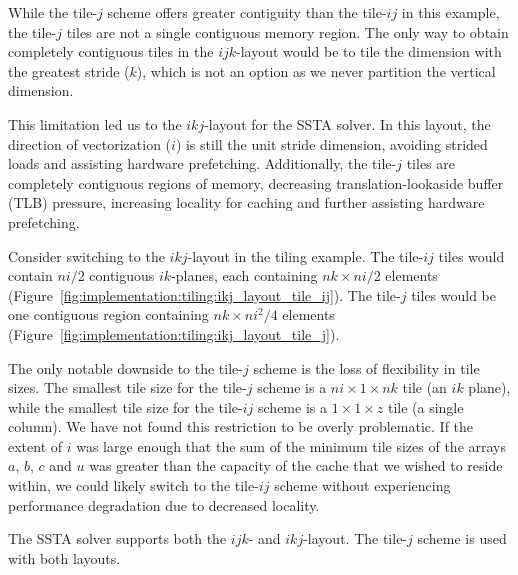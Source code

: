 \documentclass{sig-alternate-05-2015}
\begin{document}
While the tile-\(j\) scheme offers greater contiguity than the
  tile-\(ij\) in this example, the tile-\(j\) tiles are not a single contiguous
  memory region.
The only way to obtain completely contiguous tiles in the \(ijk\)-layout would
  be to tile the dimension with the greatest stride (\(k\)), which is not an
  option as we never partition the vertical dimension.

This limitation led us to the \(ikj\)-layout for the SSTA solver.
In this layout, the direction of vectorization (\(i\)) is still the unit stride
  dimension, avoiding strided loads and assisting hardware prefetching.
Additionally, the tile-\(j\) tiles are completely contiguous regions of memory,
  decreasing translation-lookaside buffer (TLB) pressure, increasing locality for
  caching and further assisting hardware prefetching.

Consider switching to the \(ikj\)-layout in the tiling example.
The tile-\(ij\) tiles would contain \(ni/2\) contiguous \(ik\)-planes, each
  containing \(nk \times ni/2\) elements
  (Figure~\ref{fig:implementation:tiling:ikj_layout_tile_ij}).
The tile-\(j\) tiles would be one contiguous region containing
  \(nk \times ni^2/4\) elements
  (Figure~\ref{fig:implementation:tiling:ikj_layout_tile_j}).

The only notable downside to the tile-\(j\) scheme is the loss of
  flexibility in tile sizes.
The smallest tile size for the tile-\(j\) scheme is a \(ni \times 1 \times nk\)
  tile (an \(ik\) plane), while the smallest tile size for the
  tile-\(ij\) scheme is a \(1 \times 1 \times z\) tile (a single column).
We have not found this restriction to be overly problematic.
If the extent of \(i\) was large enough that the sum of the minimum tile sizes of
  the arrays \(a\), \(b\), \(c\) and \(u\) was greater than the capacity of the
  cache that we wished to reside within, we could likely switch to the tile-\(ij\)
  scheme without experiencing performance degradation due to decreased locality.

The SSTA solver supports both the \(ijk\)- and \(ikj\)-layout.
The tile-\(j\) scheme is used with both layouts.

\end{document}
